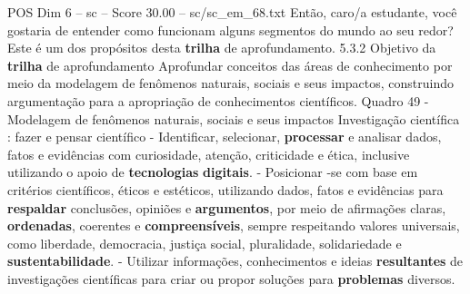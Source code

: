 \begin{textsample}{POS Dim 6 – sc – Score 30.00 – sc/sc\_em\_68.txt}
Então, caro/a estudante, você gostaria de entender como funcionam alguns segmentos do mundo ao seu redor?
Este é um dos propósitos desta \textbf{trilha} de aprofundamento. 5.3.2 Objetivo da \textbf{trilha} de aprofundamento Aprofundar conceitos das áreas de conhecimento por meio da modelagem de fenômenos naturais, sociais e seus impactos, construindo argumentação para a apropriação de conhecimentos científicos.
Quadro 49 - Modelagem de fenômenos naturais, sociais e seus impactos Investigação científica : fazer e pensar científico - Identificar, selecionar, \textbf{processar} e analisar dados, fatos e evidências com curiosidade, atenção, criticidade e ética, inclusive utilizando o apoio de \textbf{tecnologias} \textbf{digitais}. - Posicionar -se com base em critérios científicos, éticos e estéticos, utilizando dados, fatos e evidências para \textbf{respaldar} conclusões, opiniões e \textbf{argumentos}, por meio de afirmações claras, \textbf{ordenadas}, coerentes e \textbf{compreensíveis}, sempre respeitando valores universais, como liberdade, democracia, justiça social, pluralidade, solidariedade e \textbf{sustentabilidade}. - Utilizar informações, conhecimentos e ideias \textbf{resultantes} de investigações científicas para criar ou propor soluções para \textbf{problemas} diversos.

\end{textsample}
